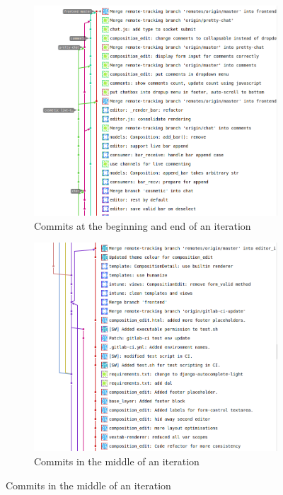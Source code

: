 \documentclass[11pt,a4paper]{article}
\begin{document}
\begin{figure}
    \centering
    \begin{subfigure}[b]{0.45\textwidth}
        \includegraphics[width=\textwidth]{graph-end-beg}
        \caption{Commits at the beginning and end of an iteration}
    \end{subfigure}
    \begin{subfigure}[b]{0.45\textwidth}
        \includegraphics[width=\textwidth]{graph-mid}
        \caption{Commits in the middle of an iteration}
    \end{subfigure}
\end{figure}
\end{document}
